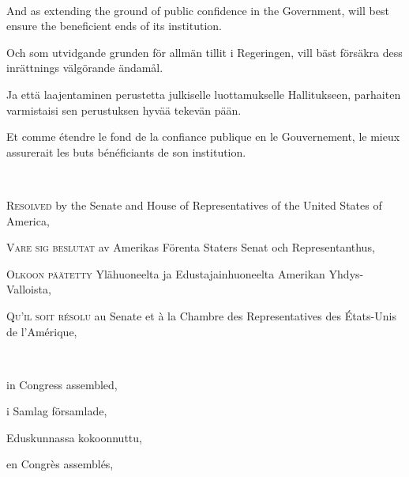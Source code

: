 \documentclass[a4paper,landscape,12pt]{article}
\begin{document}
~

\begin{minipage}[t]{0.22\textwidth}
And as extending the ground of public confidence in the Government, will best ensure the beneficient ends of its institution.
\end{minipage}\textwidth
\begin{minipage}[t]{0.22\textwidth}
Och som utvidgande grunden för allmän tillit i Regeringen, vill bäst försäkra dess inrättnings välgörande ändamål.
\end{minipage}\textwidth
\begin{minipage}[t]{0.22\textwidth}
Ja että laajentaminen perustetta julkiselle luottamukselle Hallitukseen, parhaiten varmistaisi sen perustuksen hyvää tekevän pään.
\end{minipage}\textwidth
\begin{minipage}[t]{0.22\textwidth}
Et comme étendre le fond de la confiance publique en le Gouvernement, le mieux assurerait les buts bénéficiants de son institution.
\end{minipage}

~

\begin{minipage}[t]{0.22\textwidth}
\textsc{Resolved} by the Senate and House of Representatives of the United States of America,
\end{minipage}\textwidth
\begin{minipage}[t]{0.22\textwidth}
\textsc{Vare sig beslutat} av Amerikas Förenta Staters Senat och Representanthus,
\end{minipage}\textwidth
\begin{minipage}[t]{0.22\textwidth}
\textsc{Olkoon päätetty} Ylähuoneelta ja Edustajainhuoneelta Amerikan Yhdys-Valloista,
\end{minipage}\textwidth
\begin{minipage}[t]{0.22\textwidth}
\textsc{Qu'il soit résolu} au Senate et à la Chambre des Representatives des États-Unis de l'Amérique,
\end{minipage}

~

\begin{minipage}[t]{0.22\textwidth}
in Congress assembled,
\end{minipage}\textwidth
\begin{minipage}[t]{0.22\textwidth}
i Samlag församlade,
\end{minipage}\textwidth
\begin{minipage}[t]{0.22\textwidth}
Eduskunnassa kokoonnuttu,
\end{minipage}\textwidth
\begin{minipage}[t]{0.22\textwidth}
en Congrès assemblés,
\end{minipage}
\end{document}
